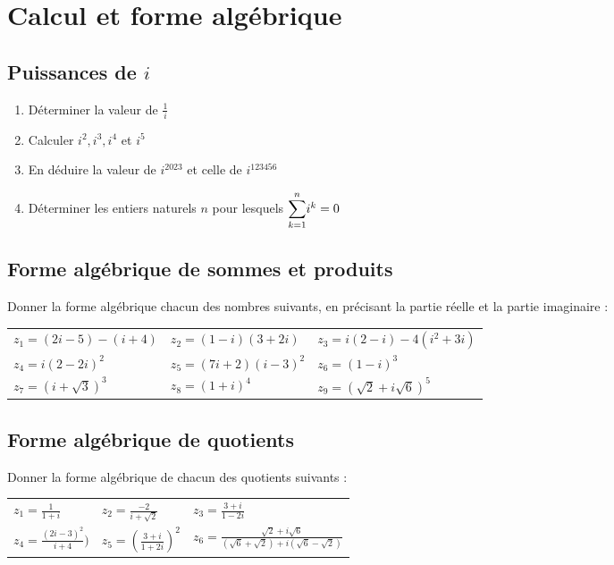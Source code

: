 \documentclass[oneside,12pt]{book}          %
\begin{document}
\newpage



\section{Calcul et forme algébrique}

\subsection{Puissances de $i$}
\begin{enumerate}
    \item Déterminer la valeur de $\frac{1}{i}$
    \item Calculer $i^2, i^3, i^4$ et $i^5$
    \item En déduire la valeur de $i^{2023}$ et celle de $i^{123456}$
    \item Déterminer les entiers naturels $n$ pour lesquels ${\displaystyle\sum_{k=1}^{n}}i^k =0$
\end{enumerate}



\subsection{Forme algébrique de sommes et produits}
Donner la forme algébrique chacun des nombres suivants, en précisant la partie réelle et la partie imaginaire :\\
\renewcommand{\arraystretch}{1.5}
\begin{tabular}{p{} p{} p{}}
    $z_1=(2i-5)-(i+4)$ & $z_2=(1-i)(3+2i)$ & $z_3=i(2-i)-4(i^2+3i)$ \\
    $z_4=i(2-2i)^2$ & $z_5=(7i+2)(i-3)^2$ & $z_6=(1-i)^3$ \\
    $z_7=(i+\sqrt{3})^3$ & $z_8=(1+i)^4$ & $z_9=(\sqrt{2}+i\sqrt{6})^5$
\end{tabular}



\subsection{Forme algébrique de quotients}
Donner la forme algébrique de chacun des quotients suivants :\\
\renewcommand{\arraystretch}{1.5}
\begin{tabular}{p{} p{} p{}}
    $z_1=\frac{1}{1+i}$ & $z_2=\frac{-2}{i+\sqrt{2}}$ & $z_3=\frac{3+i}{1-2i}$ \\
    $z_4=\frac{(2i-3)^2}{i+4})$ & $z_5=\left(\frac{3+i}{1+2i}\right)^2$ & $z_6=\frac{\sqrt{2}+i\sqrt{6}}{(\sqrt{6}+\sqrt{2})+i(\sqrt{6}-\sqrt{2})}$ \\
\end{tabular}
\end{document}
